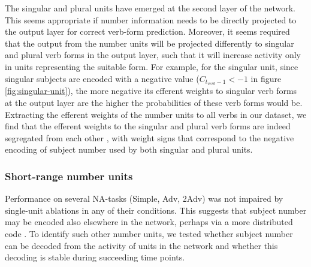 The singular and plural units have emerged at the second layer of the network. This seems appropriate if number information needs to be directly projected to the output layer for correct verb-form prediction. Moreover, it seems required that the output from the number units will be projected differently to singular and plural verb forms in the output layer, such that it will increase activity only in units representing the suitable form. For example, for the singular unit, since singular subjects are encoded with a negative value ($C_{t_{verb}-1}<-1$ in figure \ref{fig:singular-unit}), the more negative its efferent weights to singular verb forms at the output layer are the higher the probabilities of these verb forms would be. Extracting the efferent weights of the number units to all verbs in our dataset, we find that the efferent weights to the singular and plural verb forms are indeed segregated from each other , with weight signs that correspond to the negative encoding of subject number used by both singular and plural units. 

\subsubsection{Short-range number units}
Performance on several NA-tasks (Simple, Adv, 2Adv) was not impaired by single-unit ablations in any of their conditions. This suggests that subject number may be encoded also elsewhere in the network, perhaps via a more distributed code . To identify such other number units, we tested whether subject number can be decoded from the activity of units in the network and whether this decoding is stable during succeeding time points. 

